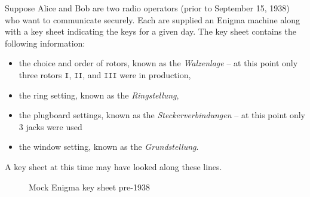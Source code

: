 Suppose Alice and Bob are two radio operators (prior to September 15,
1938) who want to communicate securely. Each are supplied an Enigma
machine along with a key sheet indicating the keys for a given day.
The key sheet contains the following information:
\begin{itemize}
  \item the choice and order of rotors, known as the
    \emph{Walzenlage} -- at this point only three
    rotors \texttt{I}, \texttt{II}, and \texttt{III} were in
    production,
  \item the ring setting, known as the \emph{Ringstellung},
  \item the plugboard settings, known as the
    \emph{Steckerverbindungen} -- at this point only 3 jacks were used

  \item the window setting, known as the \emph{Grundstellung}.
\end{itemize}
A key sheet at this time may have looked along these lines.

\begin{figure}[H]
  \begin{center}
  \end{center}
  \caption{Mock Enigma key sheet pre-1938}
  \label{fig:keysheet_early}
\end{figure}

